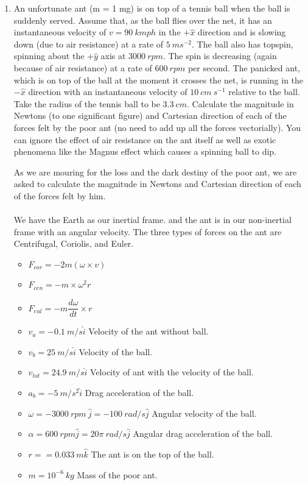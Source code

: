 \documentclass[fleqn]{article}
\begin{document}
\begin{enumerate}
    \pagebreak

    \item An unfortunate ant (m = 1 mg) is on top of a tennis ball when the ball is suddenly served. Assume that, as the ball flies over the net,
    it has an instantaneous velocity of $v=90 ~ kmph$ in the $+\hat{x}$ direction and is slowing down (due to air resistance) at a rate of
    $5 ~ ms^{-2}$. The ball also has topspin, spinning about the $+\hat{y}$ axis at $3000 ~ rpm$. The spin is decreasing (again because of air resistance) at a rate of
    $600 ~ rpm$ per second. The panicked ant, which is on top of the ball at the moment it crosses the net, is running in the $-\hat{x}$ direction with an
    instantaneous velocity of $10 ~ cm ~ s^{-1}$ relative to the ball. Take the radius of the tennis ball to be $3.3 ~ cm$. Calculate the magnitude in Newtons
    (to one significant figure) and Cartesian direction of each of the forces felt by the poor ant (no need to add up all the forces vectorially). You
    can ignore the effect of air resistance on the ant itself as well as exotic phenomena like the Magnus effect which causes a spinning ball to dip.

      \textcolor{hwColor}{
        As we are mouring for the loss and the dark destiny of the poor ant, we are asked to 
        calculate the magnitude in Newtons and Cartesian direction of each of the forces felt 
        by him. \\
        \\
        We have the Earth as our inertial frame. and the ant is in our non-inertial frame with an angular velocity.
        The three types of forces on the ant are Centrifugal, Coriolis, and Euler. 
        \begin{itemize}
          \item $F_{cor}=-2m \left(\omega \times v\right)$
          \item $F_{cen}=-m \times \omega^2 r$
          \item $F_{eul}=-m \dfrac{d \omega}{dt} \times r$
        \end{itemize}
      }

      \textcolor{hwColor}{
        \begin{itemize}
          \item $v_a=-0.1 ~ m/s \hat{i}$ Velocity of the ant without ball.
          \item $v_b=25 ~ m/s \hat{i}$ Velocity of the ball.
          \item $v_{tot}=24.9 ~ m/s \hat{i}$ Velocity of ant with the velocity of the ball.
          \item $a_b=-5 ~ m/s^2 \hat{i}$ Drag acceleration of the ball.
          \item $\omega=-3000 ~ rpm ~ \hat{j}=-100 ~ rad/s \hat{j}$ Angular velocity of the ball.
          \item $\alpha=600 ~ rpm \hat{j}=20 \pi ~ rad/s \hat{j}$ Angular drag acceleration of the ball.
          \item $r==0.033 ~ m \hat{k}$ The ant is on the top of the ball.
          \item $m=10^{-6} ~ kg$ Mass of the poor ant.   
        \end{itemize}
      }


\end{enumerate}
\end{document}
